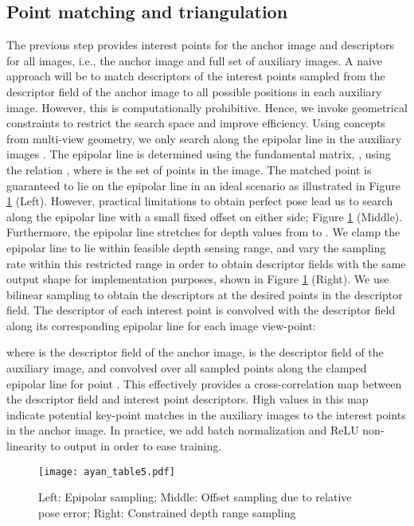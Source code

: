 \documentclass[runningheads]{llncs}
\begin{document}
\subsection{Point matching and triangulation}
The previous step provides interest points for the anchor image and descriptors for all images, i.e., the anchor image and full set of auxiliary images. A naive approach will be to match descriptors of the interest points sampled from the descriptor field of the anchor image to all possible positions in each auxiliary image. However, this is computationally prohibitive. Hence, we invoke geometrical constraints to restrict the search space and improve efficiency. Using concepts from multi-view geometry, we only search along the epipolar line in the auxiliary images \cite{hartley2003multiple}. The epipolar line is determined using the fundamental matrix, , using the relation , where  is the set of points in the image. The matched point is guaranteed to lie on the epipolar line in an ideal scenario as illustrated in Figure \ref{fig3} (Left). However, practical limitations to obtain perfect pose lead us to search along the epipolar line with a small fixed offset on either side; Figure \ref{fig3} (Middle). Furthermore, the epipolar line stretches for depth values from    to . We clamp the epipolar line to lie within feasible depth sensing range, and vary the sampling rate within this restricted range in order to obtain descriptor fields with the same output shape for implementation purposes, shown in Figure \ref{fig3} (Right). We use bilinear sampling to obtain the descriptors at the desired points in the descriptor field. The descriptor of each interest point is convolved with the descriptor field along its corresponding epipolar line for each image view-point:

where  is the descriptor field of the anchor image,  is the descriptor field of the  auxiliary image, and convolved over all sampled points  along the clamped epipolar line  for point .  This effectively provides a cross-correlation map \cite{bertinetto2016fully} between the descriptor field and interest point descriptors. High values in this map indicate potential key-point matches in the auxiliary images to the interest points in the anchor image. In practice, we add batch normalization \cite{ioffe2015batch} and ReLU non-linearity \cite{krizhevsky2012imagenet} to output  in order to ease training. 

\begin{figure}[t]
\centering
\texttt{[image: ayan\_table5.pdf]}
\caption{Left: Epipolar sampling; Middle: Offset sampling due to relative pose error; Right: Constrained depth range sampling} 
\label{fig3}
\end{figure}
\end{document}

